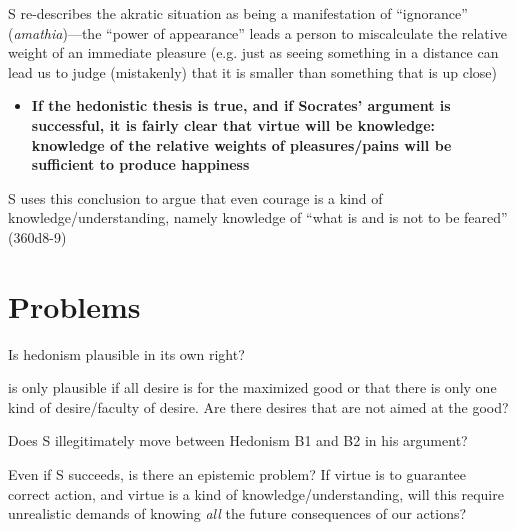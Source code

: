 \documentclass[11pt]{article}
\begin{document}
 \noindent S re-describes the akratic situation as being a manifestation of ``ignorance'' (\emph{amathia})---the ``power of appearance'' leads a person to miscalculate the relative weight of an immediate pleasure (e.g. just as seeing something in a distance can lead us to judge (mistakenly) that it is smaller than something that is up close)
\begin{itemize}\item{\textbf{If the hedonistic thesis is true, and if Socrates' argument is successful, it is fairly clear that virtue will be knowledge: knowledge of the relative weights of pleasures/pains will be sufficient to produce happiness}}\end{itemize}

 \vspace*{2mm}
 
 \noindent S uses this conclusion to argue that even courage is a kind of knowledge/understanding, namely knowledge of ``what is and is not to be feared'' (360d8-9)
 
 \section*{Problems}
 
 \noindent Is hedonism plausible in its own right?
 \vspace*{2mm}
 
 \noindent [P6] is only plausible if all desire is for the maximized good or that there is only one kind of desire/faculty of desire. Are there desires that are not aimed at the good?
 \vspace*{2mm}
  
 \noindent Does S illegitimately move between Hedonism B1 and B2 in his argument?
 \vspace*{2mm}
 
 \noindent Even if S succeeds, is there an epistemic problem? If virtue is to guarantee correct action, and virtue is a kind of knowledge/understanding, will this require unrealistic demands of knowing \emph{all} the future consequences of our actions?
\end{document}
